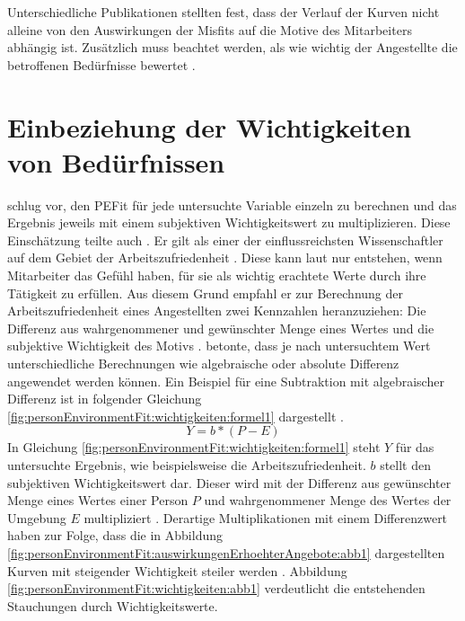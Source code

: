 Unterschiedliche Publikationen stellten fest, dass der Verlauf der Kurven nicht alleine von den Auswirkungen der Misfits auf die Motive des Mitarbeiters abhängig ist. Zusätzlich muss beachtet werden, als wie wichtig der Angestellte die betroffenen Bedürfnisse bewertet \cite[S. 9f.]{edwards:1996}. 

\section{Einbeziehung der Wichtigkeiten von Bedürfnissen}
\label{ch:personEnvironmentFit:wichtigkeiten}
\textcite[S. 38]{harrison:1985} schlug vor, den \ac{PEFit} für jede untersuchte Variable einzeln zu berechnen und das Ergebnis jeweils mit einem subjektiven Wichtigkeitswert zu multiplizieren. Diese Einschätzung teilte auch \textcite[S. 18]{locke:1969}\cite[S. 8f.]{locke:1976}. Er gilt als einer der einflussreichsten Wissenschaftler auf dem Gebiet der Arbeitszufriedenheit \cite[S. 12]{edwards:2008}. Diese kann laut \textcite[S. 8]{locke:1969} nur entstehen, wenn Mitarbeiter das Gefühl haben, für sie als wichtig erachtete Werte durch ihre Tätigkeit zu erfüllen. Aus diesem Grund empfahl er zur Berechnung der Arbeitszufriedenheit eines Angestellten zwei Kennzahlen heranzuziehen: Die Differenz aus wahrgenommener und gewünschter Menge eines Wertes und die subjektive Wichtigkeit des Motivs \cite[S. 8]{locke:1976}. \textcite[S. 16]{locke:1969} betonte, dass je nach untersuchtem Wert unterschiedliche Berechnungen wie algebraische oder absolute Differenz angewendet werden können. Ein Beispiel für eine Subtraktion mit algebraischer Differenz ist in folgender Gleichung \ref{fig:personEnvironmentFit:wichtigkeiten:formel1} dargestellt \cite[S. 9]{edwards:1990}.
\begin{equation}
	Y = b * (P - E)
	\label{fig:personEnvironmentFit:wichtigkeiten:formel1}
\end{equation}
In Gleichung \ref{fig:personEnvironmentFit:wichtigkeiten:formel1} steht $Y$ für das untersuchte Ergebnis, wie beispielsweise die Arbeitszufriedenheit. $b$ stellt den subjektiven Wichtigkeitswert dar. Dieser wird mit der Differenz aus gewünschter Menge eines Wertes einer Person $P$ und wahrgenommener Menge des Wertes der Umgebung $E$ multipliziert \cite[S. 9f.]{edwards:1990}.
\newpage
Derartige Multiplikationen mit einem Differenzwert haben zur Folge, dass die in Abbildung \ref{fig:personEnvironmentFit:auswirkungenErhoehterAngebote:abb1} dargestellten Kurven mit steigender Wichtigkeit steiler werden \cite[S. 9]{locke:1976}. Abbildung \ref{fig:personEnvironmentFit:wichtigkeiten:abb1} verdeutlicht die entstehenden Stauchungen durch Wichtigkeitswerte.

